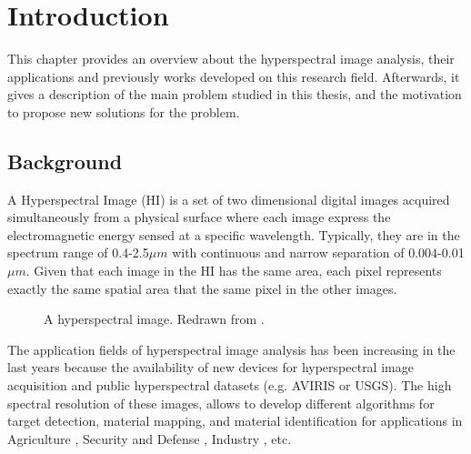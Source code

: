\documentclass[11pt, oneside]{Thesis} %
\begin{document}

\chapter{Introduction} %

\label{ChapterIntroduction} %


This chapter provides an overview about the hyperspectral image analysis, their applications 
and previously works developed on this research field. Afterwards, it gives a description 
of the main problem studied in this thesis, and the motivation to propose new solutions for 
the problem.


\section{Background}

A Hyperspectral Image (HI) is a set of two dimensional digital images acquired simultaneously 
from a physical surface where each image express the electromagnetic energy sensed at a specific 
wavelength. Typically, they are in the spectrum range of 0.4-2.5$\mu m$ with continuous and narrow 
separation of 0.004-0.01$\mu m$. Given that each image in the HI has the same area, each pixel 
represents exactly the same spatial area that the same pixel in the other images. \\

\begin{figure}[ht]
  \centering
  \centering
  \caption{A hyperspectral image. Redrawn from \cite{BioucasSurvey}.}
  \label{HIFigure}
\end{figure}


The application fields of hyperspectral image analysis has been increasing in the last 
years because the availability of new devices for hyperspectral image acquisition and 
public hyperspectral datasets (e.g. AVIRIS\cite{AVIRIS} or USGS\cite{USGS}). The high 
spectral resolution of these images, allows to develop different algorithms for target 
detection, material mapping, and material identification for applications in 
Agriculture \cite{Applications}, Security and Defense \cite{Applications}, Industry 
\cite{Applications}, etc.\\
\end{document}
